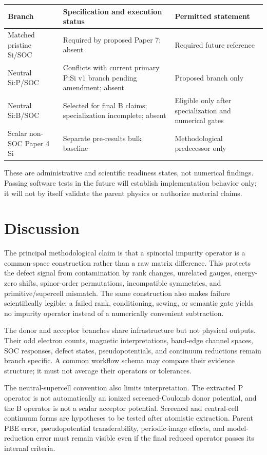 \documentclass[11pt]{article}
\begin{document}
\begin{center}\small
\begin{tabularx}{\textwidth}{YYY}
\toprule
\textbf{Branch} & \textbf{Specification and execution status} &
\textbf{Permitted statement} \\
\midrule
Matched pristine Si/SOC & Required by proposed Paper 7; absent & Required future reference \\
Neutral Si:P/SOC & Conflicts with current primary P:Si v1 branch pending amendment; absent & Proposed branch only \\
Neutral Si:B/SOC & Selected for final B claims; specialization incomplete; absent & Eligible only after specialization and numerical gates \\
Scalar non-SOC Paper 4 Si & Separate pre-results bulk baseline & Methodological predecessor only \\
\bottomrule
\end{tabularx}
\end{center}
These are administrative and scientific readiness states, not numerical findings.
Passing software tests in the future will establish implementation behavior only; it
will not by itself validate the parent physics or authorize material claims.

\section{Discussion}
The principal methodological claim is that a spinorial impurity operator is a
common-space construction rather than a raw matrix difference. This protects the defect
signal from contamination by rank changes, unrelated gauges, energy-zero shifts,
spinor-order permutations, incompatible symmetries, and primitive/supercell mismatch.
The same construction also makes failure scientifically legible: a failed rank,
conditioning, sewing, or semantic gate yields no impurity operator instead of a
numerically convenient subtraction.

The donor and acceptor branches share infrastructure but not physical outputs. Their
odd electron counts, magnetic interpretations, band-edge channel spaces, SOC responses,
defect states, pseudopotentials, and continuum reductions remain branch specific. A
common workflow schema may compare their evidence structure; it must not average their
operators or tolerances.

The neutral-supercell convention also limits interpretation. The extracted P operator is
not automatically an ionized screened-Coulomb donor potential, and the B operator is not
a scalar acceptor potential. Screened and central-cell continuum forms are hypotheses to
be tested after atomistic extraction. Parent PBE error, pseudopotential transferability,
periodic-image effects, and model-reduction error must remain visible even if the final
reduced operator passes its internal criteria.
\end{document}
